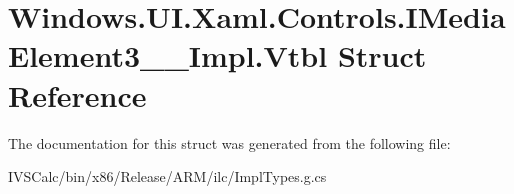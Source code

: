 \hypertarget{struct_windows_1_1_u_i_1_1_xaml_1_1_controls_1_1_i_media_element3_____impl_1_1_vtbl}{}\section{Windows.\+U\+I.\+Xaml.\+Controls.\+I\+Media\+Element3\+\_\+\+\_\+\+Impl.\+Vtbl Struct Reference}
\label{struct_windows_1_1_u_i_1_1_xaml_1_1_controls_1_1_i_media_element3_____impl_1_1_vtbl}


The documentation for this struct was generated from the following file\+:\begin{DoxyCompactItemize}
\item 
I\+V\+S\+Calc/bin/x86/\+Release/\+A\+R\+M/ilc/Impl\+Types.\+g.\+cs\end{DoxyCompactItemize}
